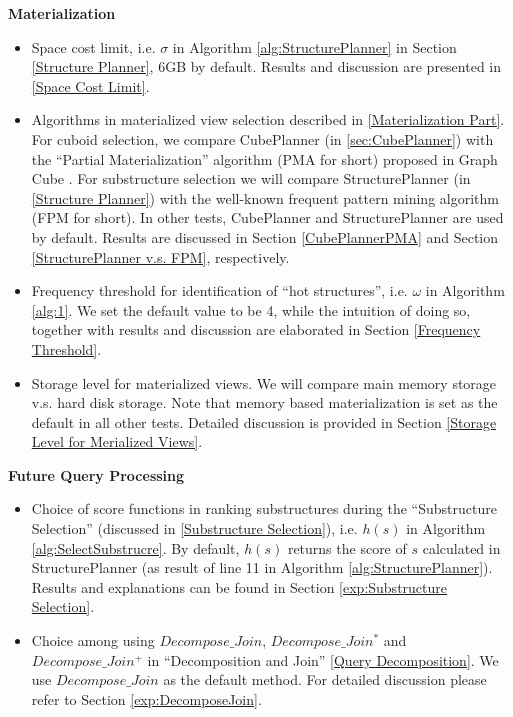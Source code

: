 \textbf{Materialization}
\begin{itemize}
	
	\item  Space cost limit, i.e. $\sigma$ in Algorithm \ref{alg:StructurePlanner} in Section \ref{Structure Planner}, 6GB by default. Results and discussion are presented in \ref{Space Cost Limit}.
	
	\item  Algorithms in materialized view selection described in \ref{Materialization Part}. For cuboid selection, we compare CubePlanner (in \ref{sec:CubePlanner}) with the ``Partial Materialization'' algorithm (PMA for short) proposed in Graph Cube \cite{DBLP:conf/sigmod/ZhaoLXH11}. For substructure selection we will compare StructurePlanner (in \ref{Structure Planner}) with the well-known frequent pattern mining algorithm (FPM for short). In other tests, CubePlanner and StructurePlanner are used by default. Results are discussed in Section \ref{CubePlannerPMA} and Section \ref{StructurePlanner v.s. FPM}, respectively.
	
	\item Frequency threshold for identification of “hot structures”, i.e. $\omega$ in Algorithm \ref{alg:1}. We set the default value to be 4, while the intuition of doing so, together with results and discussion are elaborated in Section \ref{Frequency Threshold}.
	
	\item Storage level for materialized views. We will compare main memory storage v.s. hard disk storage. Note that memory based materialization is set as the default in all other tests. Detailed discussion is provided in Section \ref{Storage Level for Merialized Views}.
	
\end{itemize}

\textbf{Future Query Processing}
\begin{itemize}
	\item  Choice of score functions in ranking substructures during the  ``Substructure Selection'' (discussed in \ref{Substructure Selection}), i.e. $h(s)$ in Algorithm \ref{alg:SelectSubstrucre}. By default, $h(s)$ returns the score of $s$ calculated in StructurePlanner (as result of line 11 in Algorithm \ref{alg:StructurePlanner}). Results and explanations can be found in Section \ref{exp:Substructure Selection}.
	
	\item  Choice among using $Decompose\_Join$, $Decompose\_Join^{*}$ and $Decompose\_Join^{+}$ in ``Decomposition and Join'' \ref{Query Decomposition}. We use $Decompose\_Join$ as the default method. For detailed discussion please refer to Section \ref{exp:DecomposeJoin}.
	
\end{itemize}

